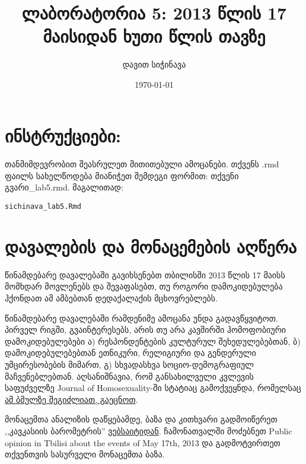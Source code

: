 \documentclass{article}\usepackage[]{graphicx}\usepackage[]{color}
\title{ლაბორატორია 5: 2013 წლის 17 მაისიდან ხუთი წლის თავზე}
\author{დავით სიჭინავა}
\date{\today}
\makeatletter
\newcommand{\hlstd}[1]{\textcolor[rgb]{0.345,0.345,0.345}{#1}}%
\newenvironment{kframe}{%
 \def\at@end@of@kframe{}%
 \ifinner\ifhmode%
  \def\at@end@of@kframe{\end{minipage}}%
  \begin{minipage}{\columnwidth}%
 \fi\fi%
 \def\FrameCommand##1{\hskip\@totalleftmargin \hskip-\fboxsep
 \colorbox{shadecolor}{##1}\hskip-\fboxsep
     \hskip-\linewidth \hskip-\@totalleftmargin \hskip\columnwidth}%
 \MakeFramed {\advance\hsize-\width
   \@totalleftmargin\z@ \linewidth\hsize
   \@setminipage}}%
 {\par\unskip\endMakeFramed%
 \at@end@of@kframe}
\newenvironment{knitrout}{}{} %
\makeatother
\begin{document}
\maketitle

\section*{ინსტრუქციები:}

\paragraph{}
თანმიმდევრობით შეასრულეთ მითითებული ამოცანები. თქვენს .rmd ფაილს სახელწოდება მიანიჭეთ შემდეგი ფორმით: თქვენი გვარი\_lab5.rmd. მაგალითად:

\begin{knitrout}
\color{fgcolor}\begin{kframe}
\begin{alltt}
\hlstd{sichinava_lab5.Rmd}
\end{alltt}
\end{kframe}
\end{knitrout}

\section*{დავალების და მონაცემების აღწერა}

წინამდებარე დავალებაში გავიხსენებთ თბილისში 2013 წლის 17 მაისს მომხდარ მოვლენებს და შევაფასებთ, თუ როგორი დამოკიდებულება ჰქონდათ ამ ამბებთან დედაქალაქის მცხოვრებლებს. 


წინამდებარე დავალებაში რამდენიმე ამოცანა უნდა გადავწყვიტოთ. პირველ რიგში, გვაინტერესებს, არის თუ არა კავშირში ჰომოფობიური დამოკიდებულებები ა) რესპონდენტების კულტურულ შეხედულებებთან, ბ) დამოკიდებულებებთან ეთნიკური, რელიგიური და გენდერული უმცირესობების მიმართ, გ) სხვადასხვა სოციო-დემოგრაფიულ მაჩვენებლებთან. აღსანიშნავია, რომ განსახილველი კვლევის საფუძველზე Journal of Homosexuality-ში სტატიაც გამოქვეყნდა, რომელსაც \href{https://www.dropbox.com/s/spwwiokdub2a4oi/mestvirishvili2016.pdf?dl=0}{ამ ბმულზე შეგიძლიათ, გაეცნოთ}.

მონაცემთა ანალიზის დაწყებამდე, ბაზა და კითხვარი გადმოიწერეთ ,,კავკასიის ბარომეტრის'' \href{http://caucasusbarometer.org/en/downloads/}{ვებსაიტიდან}. ჩამონათვალში მოძებნეთ Public opinion in Tbilisi about the events of May 17th, 2013 და გადმოტვირთეთ თქვენთვის სასურველი მონაცემთა ბაზა.
\end{document}
